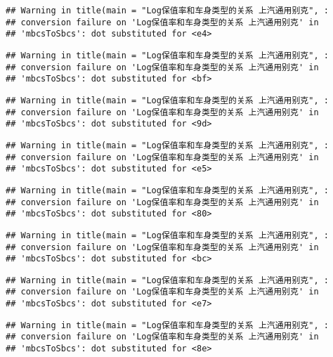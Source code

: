 \documentclass[]{article}
\begin{document}
\begin{verbatim}
## Warning in title(main = "Log保值率和车身类型的关系 上汽通用别克", :
## conversion failure on 'Log保值率和车身类型的关系 上汽通用别克' in
## 'mbcsToSbcs': dot substituted for <e4>
\end{verbatim}

\begin{verbatim}
## Warning in title(main = "Log保值率和车身类型的关系 上汽通用别克", :
## conversion failure on 'Log保值率和车身类型的关系 上汽通用别克' in
## 'mbcsToSbcs': dot substituted for <bf>
\end{verbatim}

\begin{verbatim}
## Warning in title(main = "Log保值率和车身类型的关系 上汽通用别克", :
## conversion failure on 'Log保值率和车身类型的关系 上汽通用别克' in
## 'mbcsToSbcs': dot substituted for <9d>
\end{verbatim}

\begin{verbatim}
## Warning in title(main = "Log保值率和车身类型的关系 上汽通用别克", :
## conversion failure on 'Log保值率和车身类型的关系 上汽通用别克' in
## 'mbcsToSbcs': dot substituted for <e5>
\end{verbatim}

\begin{verbatim}
## Warning in title(main = "Log保值率和车身类型的关系 上汽通用别克", :
## conversion failure on 'Log保值率和车身类型的关系 上汽通用别克' in
## 'mbcsToSbcs': dot substituted for <80>
\end{verbatim}

\begin{verbatim}
## Warning in title(main = "Log保值率和车身类型的关系 上汽通用别克", :
## conversion failure on 'Log保值率和车身类型的关系 上汽通用别克' in
## 'mbcsToSbcs': dot substituted for <bc>
\end{verbatim}

\begin{verbatim}
## Warning in title(main = "Log保值率和车身类型的关系 上汽通用别克", :
## conversion failure on 'Log保值率和车身类型的关系 上汽通用别克' in
## 'mbcsToSbcs': dot substituted for <e7>
\end{verbatim}

\begin{verbatim}
## Warning in title(main = "Log保值率和车身类型的关系 上汽通用别克", :
## conversion failure on 'Log保值率和车身类型的关系 上汽通用别克' in
## 'mbcsToSbcs': dot substituted for <8e>
\end{verbatim}
\end{document}
